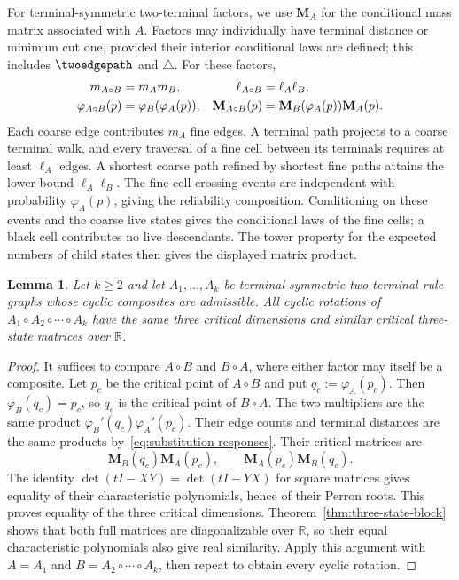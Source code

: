 \documentclass[scheme=plain,11pt]{ctexart}
\newtheorem{lemma}[theorem]{Lemma}
\theoremstyle{definition}
\theoremstyle{remark}
\begin{document}
For terminal-symmetric two-terminal factors, we use $\mathbf M_A$ for the conditional mass matrix associated with $A$.
Factors may individually have terminal distance or minimum cut one, provided their interior conditional laws are defined; this includes $\twoedgepath$ and $\triangle$.
For these factors,
\begin{align}
 m_{A\circ B}&=m_A m_B,&\ell_{A\circ B}&=\ell_A\ell_B,\notag\\
 \varphi_{A\circ B}(p)&=\varphi_B(\varphi_A(p)),&
 \mathbf M_{A\circ B}(p)&=\mathbf M_B(\varphi_A(p))\mathbf M_A(p).\label{eq:substitution-responses}
\end{align}
Each coarse edge contributes $m_A$ fine edges.
A terminal path projects to a coarse terminal walk, and every traversal of a fine cell between its terminals requires at least $\ell_A$ edges.
A shortest coarse path refined by shortest fine paths attains the lower bound $\ell_A\ell_B$.
The fine-cell crossing events are independent with probability $\varphi_A(p)$, giving the reliability composition.
Conditioning on these events and the coarse live states gives the conditional laws of the fine cells; a black cell contributes no live descendants.
The tower property for the expected numbers of child states then gives the displayed matrix product.



\begin{lemma}\label{lem:transposition-invariance}
Let $k\ge2$ and let $A_1,\ldots,A_k$ be terminal-symmetric two-terminal rule graphs whose cyclic composites are admissible.
All cyclic rotations of $A_1\circ A_2\circ\cdots\circ A_k$ have the same three critical dimensions and similar critical three-state matrices over $\mathbb R$.
\end{lemma}
\begin{proof}
It suffices to compare $A\circ B$ and $B\circ A$, where either factor may itself be a composite.
Let $p_c$ be the critical point of $A\circ B$ and put $q_c:=\varphi_A(p_c)$.
Then $\varphi_B(q_c)=p_c$, so $q_c$ is the critical point of $B\circ A$.
The two multipliers are the same product $\varphi_B'(q_c)\varphi_A'(p_c)$.
Their edge counts and terminal distances are the same products by~\eqref{eq:substitution-responses}.
Their critical matrices are
\[
 \mathbf M_B(q_c)\mathbf M_A(p_c),\qquad
 \mathbf M_A(p_c)\mathbf M_B(q_c).
\]
The identity $\det(tI-XY)=\det(tI-YX)$ for square matrices gives equality of their characteristic polynomials, hence of their Perron roots.
This proves equality of the three critical dimensions.
Theorem~\ref{thm:three-state-block} shows that both full matrices are diagonalizable over $\mathbb R$, so their equal characteristic polynomials also give real similarity.
Apply this argument with $A=A_1$ and $B=A_2\circ\cdots\circ A_k$, then repeat to obtain every cyclic rotation.
\end{proof}
\end{document}
